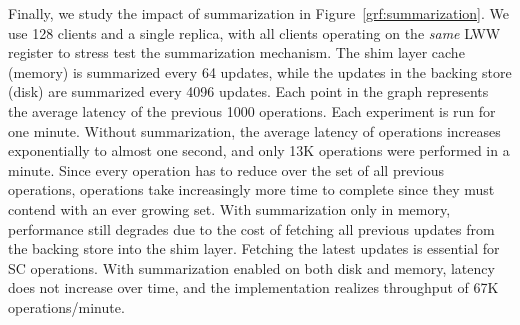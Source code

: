 Finally, we study the impact of summarization in
Figure~\ref{grf:summarization}. We use 128 clients and a single \name
replica, with all clients operating on the \emph{same} LWW register to
stress test the summarization mechanism. The shim layer cache (memory) is
summarized every 64 updates, while the updates in the backing store (disk)
are summarized every 4096 updates. Each point in the graph represents the
average latency of the previous 1000 operations. Each experiment is run for
one minute.  Without summarization, the average latency of operations
increases exponentially to almost one second, and only 13K operations were
performed in a minute. Since every operation has to reduce over the set of
all previous operations, operations take increasingly more time to complete
since they must contend with an ever growing set.  With summarization only
in memory, performance still degrades due to the cost of fetching all
previous updates from the backing store into the shim layer. Fetching the
latest updates is essential for SC operations. With summarization enabled on
both disk and memory, latency does not increase over time, and the
implementation realizes throughput of 67K operations/minute.
